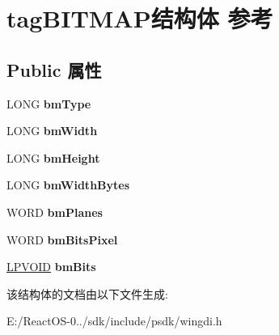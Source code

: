 \hypertarget{structtag_b_i_t_m_a_p}{}\section{tag\+B\+I\+T\+M\+A\+P结构体 参考}
\label{structtag_b_i_t_m_a_p}
\subsection*{Public 属性}
\begin{DoxyCompactItemize}
\item 
\mbox{\label{structtag_b_i_t_m_a_p_a3add1a65d707fc8c646862b99427ec90}} 
L\+O\+NG {\bfseries bm\+Type}
\item 
\mbox{\label{structtag_b_i_t_m_a_p_a394b86ff48cbfd74e11e9ba77c0939fc}} 
L\+O\+NG {\bfseries bm\+Width}
\item 
\mbox{\label{structtag_b_i_t_m_a_p_a1fd87a6e09cf385e7767c5e0d89e36cf}} 
L\+O\+NG {\bfseries bm\+Height}
\item 
\mbox{\label{structtag_b_i_t_m_a_p_a4712d1f8f111498bc6c48ad6b5e46880}} 
L\+O\+NG {\bfseries bm\+Width\+Bytes}
\item 
\mbox{\label{structtag_b_i_t_m_a_p_aac2a640a9f7a3d5cfc2ee8a69ce96dc8}} 
W\+O\+RD {\bfseries bm\+Planes}
\item 
\mbox{\label{structtag_b_i_t_m_a_p_ab3899c1b65a77c36a093881dad21f0d4}} 
W\+O\+RD {\bfseries bm\+Bits\+Pixel}
\item 
\mbox{\label{structtag_b_i_t_m_a_p_a9a808b859932cac0089d2e12974cee61}} 
\hyperlink{interfacevoid}{L\+P\+V\+O\+ID} {\bfseries bm\+Bits}
\end{DoxyCompactItemize}


该结构体的文档由以下文件生成\+:\begin{DoxyCompactItemize}
\item 
E\+:/\+React\+O\+S-\/0../sdk/include/psdk/wingdi.\+h\end{DoxyCompactItemize}

